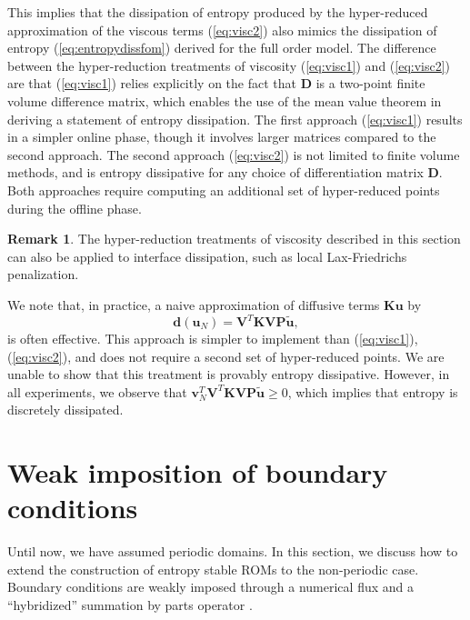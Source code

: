\documentclass[preprint,10pt]{elsarticle}
\theoremstyle{definition}
\theoremstyle{lemma}
\newtheorem*{remark}{Remark}
\theoremstyle{theorem}
\theoremstyle{assumption}
\renewcommand{\tilde}{\widetilde}
\begin{document}
This implies that the dissipation of entropy produced by the hyper-reduced approximation of the viscous terms (\ref{eq:visc2}) also mimics the dissipation of entropy (\ref{eq:entropydissfom}) derived for the full order model.
The difference between the hyper-reduction treatments of viscosity (\ref{eq:visc1}) and (\ref{eq:visc2}) are that (\ref{eq:visc1}) relies explicitly on the fact that $\bm{D}$ is a two-point finite volume difference matrix, which enables the use of the mean value theorem in deriving a statement of entropy dissipation.   The first approach (\ref{eq:visc1}) results in a simpler online phase, though it involves larger matrices compared to the second approach.  The second approach (\ref{eq:visc2}) is not limited to finite volume methods, and is entropy dissipative for any choice of differentiation matrix $\bm{D}$.  Both approaches require computing an additional set of hyper-reduced points during the offline phase.  

\begin{remark}
The hyper-reduction treatments of viscosity described in this section can also be applied to interface dissipation, such as local Lax-Friedrichs penalization.  %
\end{remark}

We note that, in practice, a naive approximation of diffusive terms $\bm{K}\bm{u}$ by
\begin{equation}
\bm{d}(\bm{u}_N) = \bm{V}^T\bm{K}\bm{V}\bm{P}\tilde{\bm{u}},
\label{eq:visc3}
\end{equation}
is often effective.  This approach is simpler to implement than (\ref{eq:visc1}),(\ref{eq:visc2}), and does not require a second set of hyper-reduced points.  We are unable to show that this treatment is provably entropy dissipative.  However, in all experiments, we observe that $\bm{v}_N^T\bm{V}^T\bm{K}\bm{V}\bm{P}\tilde{\bm{u}} \geq 0$, which implies that entropy is discretely dissipated.  

\section{Weak imposition of boundary conditions}
\label{sec:6}
Until now, we have assumed periodic domains.  In this section, we discuss how to extend the construction of entropy stable ROMs to the non-periodic case.  Boundary conditions are weakly imposed through a numerical flux and a ``hybridized'' summation by parts operator \cite{chan2017discretely}.  
\end{document}

